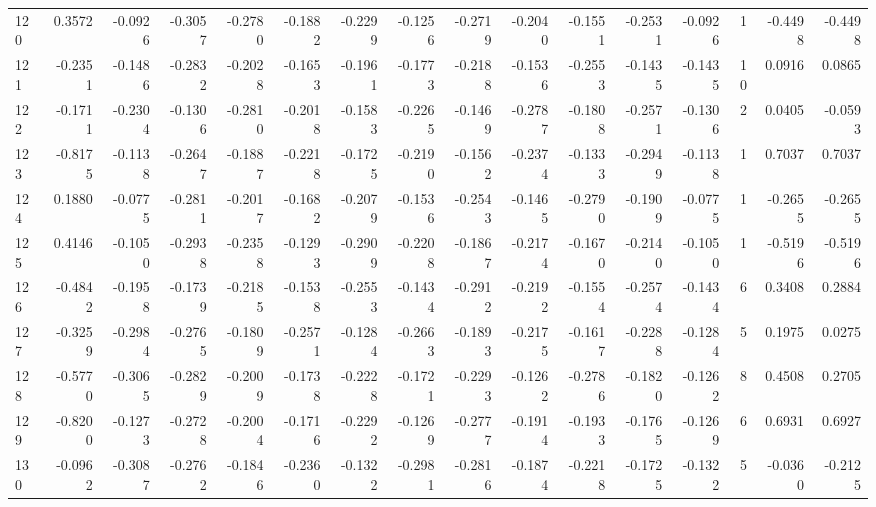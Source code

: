 \begin{tabular}{lrrrrrrrrrrrrrrr}
120 &      0.3572 & -0.0926 & -0.3057 & -0.2780 & -0.1882 & -0.2299 & -0.1256 & -0.2719 & -0.2040 & -0.1551 &  -0.2531 &    -0.0926 &      1 &                   -0.4498 &                    -0.4498 \\
121 &     -0.2351 & -0.1486 & -0.2832 & -0.2028 & -0.1653 & -0.1961 & -0.1773 & -0.2188 & -0.1536 & -0.2553 &  -0.1435 &    -0.1435 &     10 &                    0.0916 &                     0.0865 \\
122 &     -0.1711 & -0.2304 & -0.1306 & -0.2810 & -0.2018 & -0.1583 & -0.2265 & -0.1469 & -0.2787 & -0.1808 &  -0.2571 &    -0.1306 &      2 &                    0.0405 &                    -0.0593 \\
123 &     -0.8175 & -0.1138 & -0.2647 & -0.1887 & -0.2218 & -0.1725 & -0.2190 & -0.1562 & -0.2374 & -0.1333 &  -0.2949 &    -0.1138 &      1 &                    0.7037 &                     0.7037 \\
124 &      0.1880 & -0.0775 & -0.2811 & -0.2017 & -0.1682 & -0.2079 & -0.1536 & -0.2543 & -0.1465 & -0.2790 &  -0.1909 &    -0.0775 &      1 &                   -0.2655 &                    -0.2655 \\
125 &      0.4146 & -0.1050 & -0.2938 & -0.2358 & -0.1293 & -0.2909 & -0.2208 & -0.1867 & -0.2174 & -0.1670 &  -0.2140 &    -0.1050 &      1 &                   -0.5196 &                    -0.5196 \\
126 &     -0.4842 & -0.1958 & -0.1739 & -0.2185 & -0.1538 & -0.2553 & -0.1434 & -0.2912 & -0.2192 & -0.1554 &  -0.2574 &    -0.1434 &      6 &                    0.3408 &                     0.2884 \\
127 &     -0.3259 & -0.2984 & -0.2765 & -0.1809 & -0.2571 & -0.1284 & -0.2663 & -0.1893 & -0.2175 & -0.1617 &  -0.2288 &    -0.1284 &      5 &                    0.1975 &                     0.0275 \\
128 &     -0.5770 & -0.3065 & -0.2829 & -0.2009 & -0.1738 & -0.2228 & -0.1721 & -0.2293 & -0.1262 & -0.2786 &  -0.1820 &    -0.1262 &      8 &                    0.4508 &                     0.2705 \\
129 &     -0.8200 & -0.1273 & -0.2728 & -0.2004 & -0.1716 & -0.2292 & -0.1269 & -0.2777 & -0.1914 & -0.1933 &  -0.1765 &    -0.1269 &      6 &                    0.6931 &                     0.6927 \\
130 &     -0.0962 & -0.3087 & -0.2762 & -0.1846 & -0.2360 & -0.1322 & -0.2981 & -0.2816 & -0.1874 & -0.2218 &  -0.1725 &    -0.1322 &      5 &                   -0.0360 &                    -0.2125 \\

\end{tabular}
